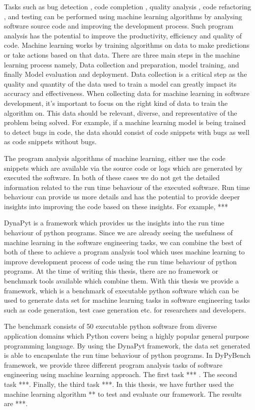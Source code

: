 Tasks such as bug detection \cite{DeepBugs2018}, code completion \cite{code_completion}, quality analysis \cite{Code_analysis_1, Code_analysis_2}, code refactoring \cite{code_refactoring}, and testing \cite{testing_1, testing_2, testing_3} can be performed using machine learning algorithms by analysing software source code and improving the development process. Such program analysis has the potential to improve the productivity, efficiency and quality of code. Machine learning works by training algorithms on data to make predictions or take actions based on that data. There are three main steps in the machine learning process namely, Data collection and preparation, model training, and finally Model evaluation and deployment. Data collection is a critical step as the quality and quantity of the data used to train a model can greatly impact its accuracy and effectiveness. When collecting data for machine learning in software development, it's important to focus on the right kind of data to train the algorithm on. This data should be relevant, diverse, and representative of the problem being solved. For example, if a machine learning model is being trained to detect bugs in code, the data should consist of code snippets with bugs as well as code snippets without bugs.

The program analysis algorithms of machine learning, either use the code snippets which are available via the source code or logs which are generated by executed the software. In both of these cases we do not get the detailed information related to the run time behaviour of the executed software. Run time behaviour can provide us more details and has the potential to provide deeper insights into improving the code based on these insights. For example, ***

DynaPyt is a framework which provides us the insights into the run time behaviour of python programs. Since we are already seeing the usefulness of machine learning in the software engineering tasks, we can combine the best of both of these to achieve a program analysis tool which uses machine learning to improve development process of code using the run time behaviour of python programs. At the time of writing this thesis, there are no framework or benchmark tools available which combine them. With this thesis we provide a framework,  which is a benchmark of executable python software which can be used to generate data set for machine learning tasks in software engineering tasks such as code generation, test case generation etc. for researchers and developers. 

The benchmark consists of 50 executable python software from diverse application domains which Python covers being a highly popular general purpose programming language. By using the DynaPyt framework, the data set generated is able to encapsulate the run time behaviour of python programs. In DyPyBench framework, we provide three different program analysis tasks of software engineering using machine learning approach. The first task *** . The second task ***. Finally, the third task ***. In this thesis, we have further used the machine learning algorithm ** to test and evaluate our framework. The results are ***. 
